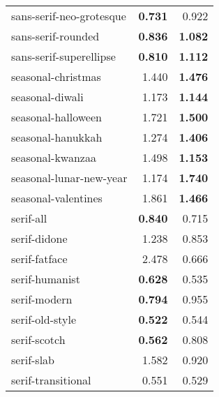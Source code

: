 \begin{longtable}{|l|r|r|}
sans-serif-neo-grotesque  & \textbf{0.731}          & 0.922               \\
sans-serif-rounded        & \textbf{0.836}          & \textbf{1.082}      \\
sans-serif-superellipse   & \textbf{0.810}          & \textbf{1.112}      \\
seasonal-christmas        & 1.440                   & \textbf{1.476}      \\
seasonal-diwali           & 1.173                   & \textbf{1.144}      \\
seasonal-halloween        & 1.721                   & \textbf{1.500}      \\
seasonal-hanukkah         & 1.274                   & \textbf{1.406}      \\
seasonal-kwanzaa          & 1.498                   & \textbf{1.153}      \\
seasonal-lunar-new-year   & 1.174                   & \textbf{1.740}      \\
seasonal-valentines       & 1.861                   & \textbf{1.466}      \\
serif-all                 & \textbf{0.840}          & 0.715               \\
serif-didone              & 1.238                   & 0.853               \\
serif-fatface             & 2.478                   & 0.666               \\
serif-humanist            & \textbf{0.628}          & 0.535               \\
serif-modern              & \textbf{0.794}          & 0.955               \\
serif-old-style           & \textbf{0.522}          & 0.544               \\
serif-scotch              & \textbf{0.562}          & 0.808               \\
serif-slab                & 1.582                   & 0.920               \\
serif-transitional        & 0.551                   & 0.529         \\           

\end{longtable}



